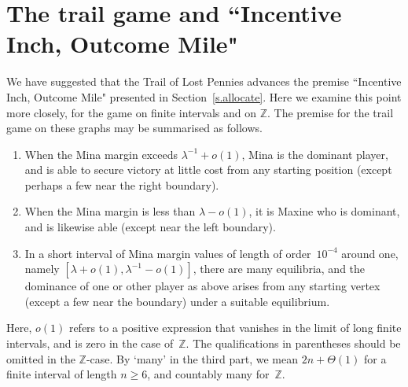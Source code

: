 \documentclass[letterpaper,11pt,oneside,reqno]{amsbook}
\newcommand{\Z}{\ensuremath{\mathbb{Z}}}
\numberwithin{figure}{chapter}
\theoremstyle{definition}
\theoremstyle{definition}
\theoremstyle{definition}
\theoremstyle{definition}
\theoremstyle{definition}
\begin{document}
\section{The trail game and ``Incentive Inch, Outcome Mile"}\label{s.playing}

We have suggested that the Trail of Lost Pennies advances the premise ``Incentive Inch, Outcome Mile" presented in Section~\ref{s.allocate}. Here we examine this point more closely, for the game on finite intervals and on $\Z$. 
The premise for the trail game on these graphs may be summarised as follows.
\begin{enumerate}
\item When the Mina margin exceeds $\lambda^{-1} + o(1)$, Mina is the dominant player, and is able to secure victory at little cost from any starting position (except perhaps a few near the right boundary).
\item When the Mina margin is less than $\lambda - o(1)$, it is Maxine who is dominant, and is likewise able (except near the left boundary).
\item In a short interval of Mina margin values of length of order~$10^{-4}$ around one, namely $[\lambda + o(1),\lambda^{-1} - o(1)]$, there are many equilibria, and the dominance of one or other player as above arises from any starting vertex (except a few near the boundary) under a suitable equilibrium.
\end{enumerate}
Here, $o(1)$ refers to a positive expression that vanishes in the limit of long finite intervals, and is zero in the case of~$\Z$. The qualifications in parentheses should be omitted in the $\Z$-case.
By `many' in the third part, we mean $2n + \Theta(1)$ for a finite interval of length $n \geq 6$, and countably many for~$\Z$.
\end{document}
